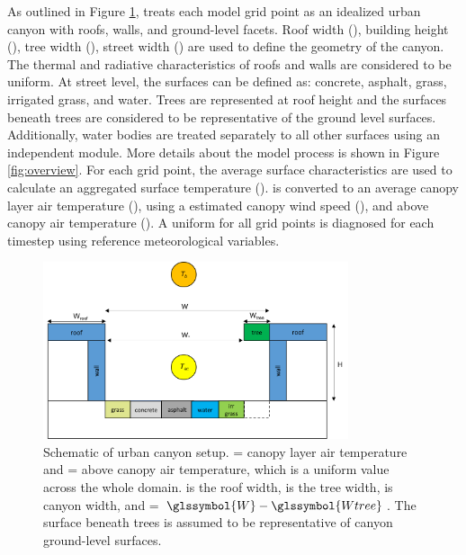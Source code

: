 \documentclass[final,3p,times,authoryear]{elsarticle}
\begin{document}
As outlined in Figure \ref{fig:canyon},  treats each model grid point as an idealized urban canyon with roofs, walls, and  ground-level facets.   Roof width (), building  height (), tree width (),  street width ()  are used to define the geometry of the canyon. The thermal and radiative characteristics of roofs and walls are considered to be uniform. At street level, the surfaces  can be defined as: concrete, asphalt, grass, irrigated grass, and water. Trees are represented at roof height and the surfaces beneath trees are considered to be representative of the ground level surfaces. 
Additionally, water bodies are treated separately to all other surfaces using an independent  module. More details about the model process is shown in Figure \ref{fig:overview}. For each grid point, the average surface characteristics are used to calculate an aggregated surface temperature ().  is converted to an average canopy layer air temperature (), using a estimated canopy wind speed (), and above canopy air temperature ().  A uniform  for all grid points is diagnosed for each timestep using reference meteorological variables. 


\begin{figure}[!htbp]
\begin{center}

\includegraphics[width=0.8\textwidth,keepaspectratio]{figure2.png}

 \caption{Schematic of  urban canyon setup.  = canopy layer air temperature and  = above canopy air temperature, which is a uniform value across the whole domain.  is the roof width,  is the tree width,  is canyon width, and  = $\glssymbol{W} - \glssymbol{Wtree}$. The surface beneath trees is assumed to be representative of  canyon ground-level surfaces. } \label{fig:canyon}
 \end{center}

\end{figure}
\end{document}
